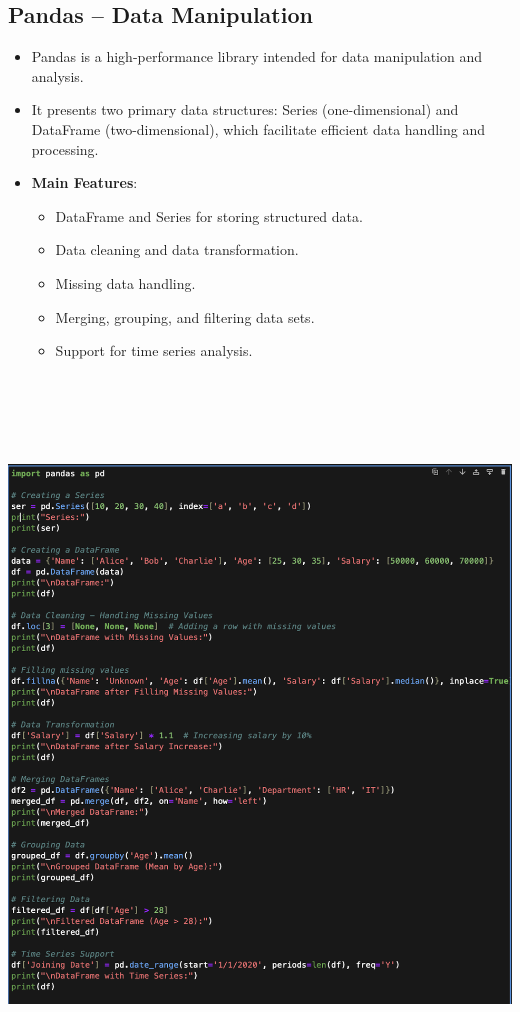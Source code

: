 \documentclass{article}
\begin{document}
\subsection{Pandas – Data Manipulation}
\begin{itemize}
    \item Pandas is a high-performance library intended for data manipulation and analysis.
    \item It presents two primary data structures: Series (one-dimensional) and DataFrame (two-dimensional), which facilitate efficient data handling and processing.
    \item \textbf{Main Features}:
    \begin{itemize}
    \item DataFrame and Series for storing structured data.
    \item Data cleaning and data transformation.
    \item Missing data handling.
    \item Merging, grouping, and filtering data sets.
    \item Support for time series analysis.
    \end{itemize}
\end{itemize}
\includegraphics[width=14
cm,height=19cm]{Pandas.png}
\end{document}
